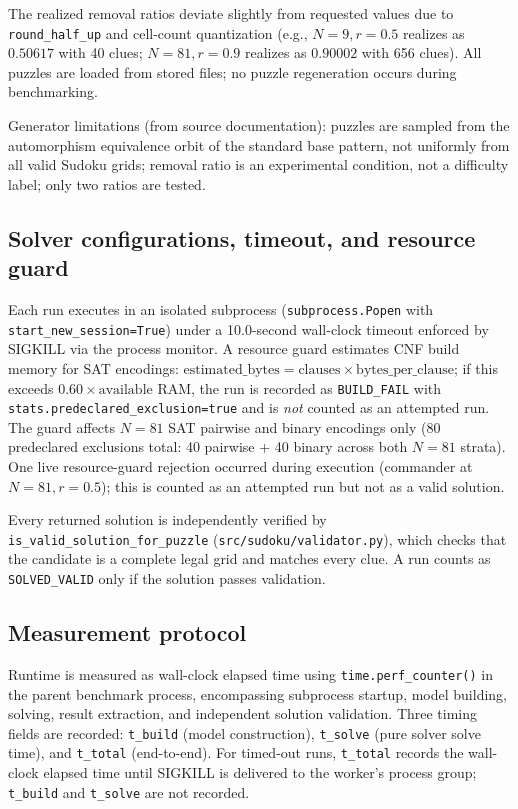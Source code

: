 \documentclass[a4paper,fleqn]{cas-sc}
\newcommand{\code}[1]{\texttt{\nolinkurl{#1}}}
\begin{document}
The realized removal ratios deviate slightly from requested values due to \texttt{round\_half\_up} and cell-count quantization (e.g., \(N=9, r=0.5\) realizes as \(0.50617\) with 40 clues; \(N=81, r=0.9\) realizes as \(0.90002\) with 656 clues). All puzzles are loaded from stored files; no puzzle regeneration occurs during benchmarking.

Generator limitations (from source documentation): puzzles are sampled from the automorphism equivalence orbit of the standard base pattern, not uniformly from all valid Sudoku grids; removal ratio is an experimental condition, not a difficulty label; only two ratios are tested.

\subsection{Solver configurations, timeout, and resource guard}

Each run executes in an isolated subprocess (\texttt{subprocess.Popen} with \texttt{start\_new\_session=True}) under a 10.0-second wall-clock timeout enforced by SIGKILL via the process monitor. A resource guard estimates CNF build memory for SAT encodings: \(\text{estimated\_bytes} = \text{clauses} \times \text{bytes\_per\_clause}\); if this exceeds \(0.60 \times \text{available RAM}\), the run is recorded as \texttt{BUILD\_FAIL} with \code{stats.predeclared_exclusion=true} and is \emph{not} counted as an attempted run. The guard affects \(N=81\) SAT pairwise and binary encodings only (80 predeclared exclusions total: 40 pairwise + 40 binary across both \(N=81\) strata). One live resource-guard rejection occurred during execution (commander at \(N=81, r=0.5\)); this is counted as an attempted run but not as a valid solution.

Every returned solution is independently verified by \code{is_valid_solution_for_puzzle} (\code{src/sudoku/validator.py}), which checks that the candidate is a complete legal grid and matches every clue. A run counts as \texttt{SOLVED\_VALID} only if the solution passes validation.

\subsection{Measurement protocol}

Runtime is measured as wall-clock elapsed time using \texttt{time.perf\_counter()} in the parent benchmark process, encompassing subprocess startup, model building, solving, result extraction, and independent solution validation. Three timing fields are recorded: \texttt{t\_build} (model construction), \texttt{t\_solve} (pure solver solve time), and \texttt{t\_total} (end-to-end). For timed-out runs, \texttt{t\_total} records the wall-clock elapsed time until SIGKILL is delivered to the worker's process group; \texttt{t\_build} and \texttt{t\_solve} are not recorded.
\end{document}

